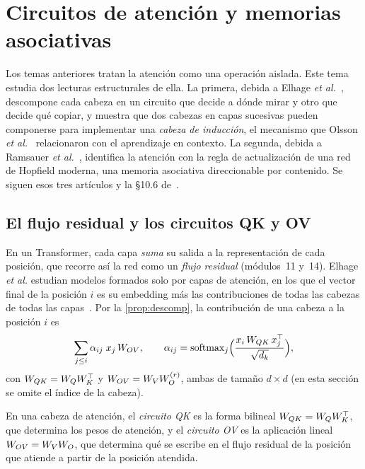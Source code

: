 \chapter{Circuitos de atención y memorias asociativas}
\label{tema:5}

Los temas anteriores tratan la atención como una operación aislada. Este tema estudia dos lecturas estructurales de ella. La primera, debida a Elhage \emph{et al.}~\cite{elhage}, descompone cada cabeza en un circuito que decide a dónde mirar y otro que decide qué copiar, y muestra que dos cabezas en capas sucesivas pueden componerse para implementar una \emph{cabeza de inducción}, el mecanismo que Olsson \emph{et al.}~\cite{olsson} relacionaron con el aprendizaje en contexto. La segunda, debida a Ramsauer \emph{et al.}~\cite{ramsauer}, identifica la atención con la regla de actualización de una red de Hopfield moderna, una memoria asociativa direccionable por contenido. Se siguen esos tres artículos y la §10.6 de~\cite{jm3}.

\section{El flujo residual y los circuitos QK y OV}

En un Transformer, cada capa \emph{suma} su salida a la representación de cada posición, que recorre así la red como un \emph{flujo residual} (módulos~11 y~14). Elhage \emph{et al.} estudian modelos formados solo por capas de atención, en los que el vector final de la posición $i$ es su embedding más las contribuciones de todas las cabezas de todas las capas~\cite{elhage}. Por la \cref{prop:descomp}, la contribución de una cabeza a la posición $i$ es
\[
\sum_{j\le i}\alpha_{ij}\;x_j\,W_{OV},\qquad
\alpha_{ij}=\operatorname{softmax}_j\Bigl(\frac{x_i\,W_{QK}\,x_j^{\top}}{\sqrt{d_k}}\Bigr),
\]
con $W_{QK}=W_{Q}W_{K}^{\top}$ y $W_{OV}=W_{V}W_{O}^{(r)}$, ambas de tamaño $d\times d$ (en esta sección se omite el índice de la cabeza).

\begin{definicion}[Circuitos QK y OV]\label{def:circuitos}
En una cabeza de atención, el \emph{circuito QK} es la forma bilineal $W_{QK}=W_{Q}W_{K}^{\top}$, que determina los pesos de atención, y el \emph{circuito OV} es la aplicación lineal $W_{OV}=W_{V}W_{O}$, que determina qué se escribe en el flujo residual de la posición que atiende a partir de la posición atendida.
\end{definicion}

